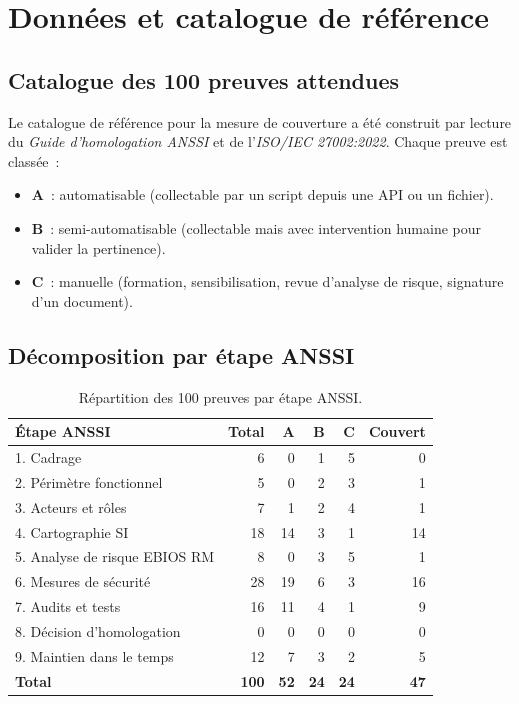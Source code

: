\chapter{Données et catalogue de référence}
\label{annexe:donnees}

\section{Catalogue des 100 preuves attendues}

Le catalogue de référence pour la mesure de couverture a été
construit par lecture du \emph{Guide d'homologation ANSSI} et de
l'\emph{ISO/IEC 27002:2022}. Chaque preuve est classée~:

\begin{itemize}
  \item \textbf{A}~: automatisable (collectable par un script
    depuis une API ou un fichier).
  \item \textbf{B}~: semi-automatisable (collectable mais avec
    intervention humaine pour valider la pertinence).
  \item \textbf{C}~: manuelle (formation, sensibilisation,
    revue d'analyse de risque, signature d'un document).
\end{itemize}

\section{Décomposition par étape ANSSI}

\begin{table}[h]
\centering
\caption{Répartition des 100 preuves par étape ANSSI.}
\label{tab:catalogue}
\small
\begin{tabular}{lrrrrr}
\toprule
\textbf{Étape ANSSI} & \textbf{Total} & \textbf{A} & \textbf{B} & \textbf{C} & \textbf{Couvert} \\
\midrule
1. Cadrage & 6 & 0 & 1 & 5 & 0 \\
2. Périmètre fonctionnel & 5 & 0 & 2 & 3 & 1 \\
3. Acteurs et rôles & 7 & 1 & 2 & 4 & 1 \\
4. Cartographie SI & 18 & 14 & 3 & 1 & 14 \\
5. Analyse de risque EBIOS RM & 8 & 0 & 3 & 5 & 1 \\
6. Mesures de sécurité & 28 & 19 & 6 & 3 & 16 \\
7. Audits et tests & 16 & 11 & 4 & 1 & 9 \\
8. Décision d'homologation & 0 & 0 & 0 & 0 & 0 \\
9. Maintien dans le temps & 12 & 7 & 3 & 2 & 5 \\
\midrule
\textbf{Total} & \textbf{100} & \textbf{52} & \textbf{24} & \textbf{24} & \textbf{47} \\
\bottomrule
\end{tabular}
\end{table}

